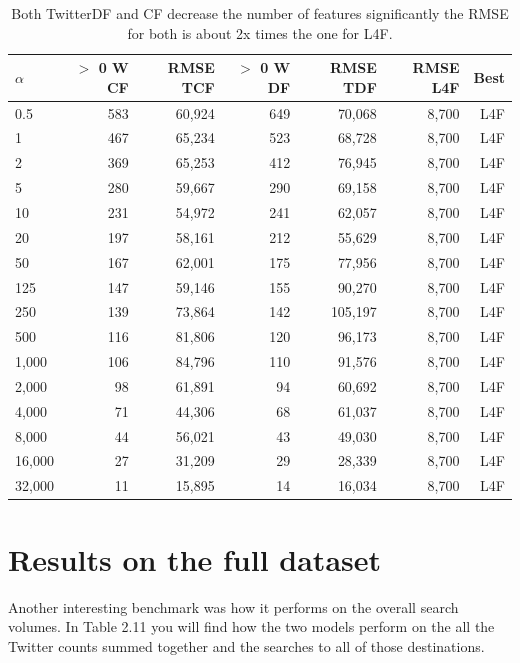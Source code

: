 \documentclass[minf,frontabs,twoside,singlespacing,parskip]{infthesis}
\begin{document}
\begin{table}[h!]
\begin{center}
\begin{tabular}{ l | r | r | r | r | r | r}
$\alpha$ & $>$ 0 W CF & RMSE TCF & $>$ 0 W DF & RMSE TDF & RMSE L4F & Best\\
\hline
0.5 & 583 & 60,924 & 649 & 70,068 & 8,700 & L4F\\
1 & 467 & 65,234 & 523 & 68,728 & 8,700 & L4F\\
2 & 369 & 65,253 & 412 & 76,945 & 8,700 & L4F\\
5 & 280 & 59,667 & 290 & 69,158 & 8,700 & L4F\\
10 & 231 & 54,972 & 241 & 62,057 & 8,700 & L4F\\
20 & 197 & 58,161 & 212 & 55,629 & 8,700 & L4F\\
50 & 167 & 62,001 & 175 & 77,956 & 8,700 & L4F\\
125 & 147 & 59,146 & 155 & 90,270 & 8,700 & L4F\\
250 & 139 & 73,864 & 142 & 105,197 & 8,700 & L4F\\
500 & 116 & 81,806 & 120 & 96,173 & 8,700 & L4F\\
1,000 & 106 & 84,796 & 110 & 91,576 & 8,700 & L4F\\
2,000 & 98 & 61,891 & 94 & 60,692 & 8,700 & L4F\\
4,000 & 71 & 44,306 & 68 & 61,037 & 8,700 & L4F\\
8,000 & 44 & 56,021 & 43 & 49,030 & 8,700 & L4F\\
16,000 & 27 & 31,209 & 29 & 28,339 & 8,700 & L4F\\
32,000 & 11 & 15,895 & 14 & 16,034 & 8,700 & L4F\\
\end{tabular}
\end{center}
\caption{Both TwitterDF and CF decrease the number of features significantly the RMSE for both is about 2x times the one for L4F.}
\end{table}


\newpage
\section{Results on the full dataset}


Another interesting benchmark was how it performs on the overall search volumes. In Table 2.11 you will find how the two models perform on the all the Twitter counts summed together and the searches to all of those destinations.
\end{document}
